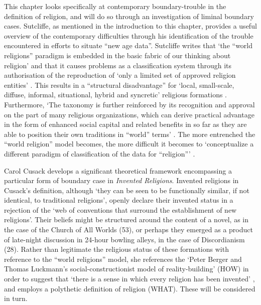 \documentclass{article}
\begin{document}
This chapter looks specifically at contemporary boundary-trouble
in the definition of religion, and will do so through an investigation
of liminal boundary cases.
Sutcliffe, as mentioned in the introduction to this chapter,
provides a useful overview of the contemporary difficulties through his
identification of the trouble encountered in efforts to situate
``new age data''.
Sutcliffe writes that `the ``world religions'' paradigm is embedded in the
basic fabric of our thinking about religion' and that it causes problems
as a classification system through its authorisation of the reproduction of
`only a limited set of approved religion entities'
\parencite[22]{Sutcliffe14}.
This results in a ``structural disadvantage'' for
`local, small-scale, diffuse, informal, situational, hybrid and syncretic'
religious formations \parencite[25]{Sutcliffe14}.
Furthermore, `The taxonomy is further reinforced by
its recognition and approval on the part of many religious organizations,
which can derive practical advantage in the form of enhanced social capital
and related benefits in so far as they are able to position
their own traditions in ``world'' terms' \parencite[23]{Sutcliffe14}.
The more entrenched the ``world religion'' model becomes,
the more difficult it becomes to `conceptualize a different paradigm
of classification of the data for ``religion''\thinspace'
\parencite[25]{Sutcliffe14}.

Carol Cusack develops a significant theoretical framework encompassing
a particular form of boundary case in \textit{Invented Religions}.
Invented religions in Cusack's \parencite*[1]{Cusack10} definition,
although `they can be seen to be functionally similar,
if not identical, to traditional religions',
openly declare their invented status in a rejection of the
`web of conventions that surround the establishment of new religions'.
Their beliefs might be structured around the content of a novel,
as in the case of the Church of All Worlds (53),
or perhaps they emerged as a product of late-night discussion in
24-hour bowling alleys, in the case of Discordianism (28).
Rather than legitimate the religious status of these formations
with reference to the ``world religions'' model, she references
the `Peter Berger and Thomas Luckmann’s
social-constructionist model of reality-building' (HOW) in order to suggest
that `there is a sense in which every religion has been invented'
\parencite{CusackPodcast}, and employs a polythetic definition of religion (WHAT).
These will be considered in turn.
\end{document}
